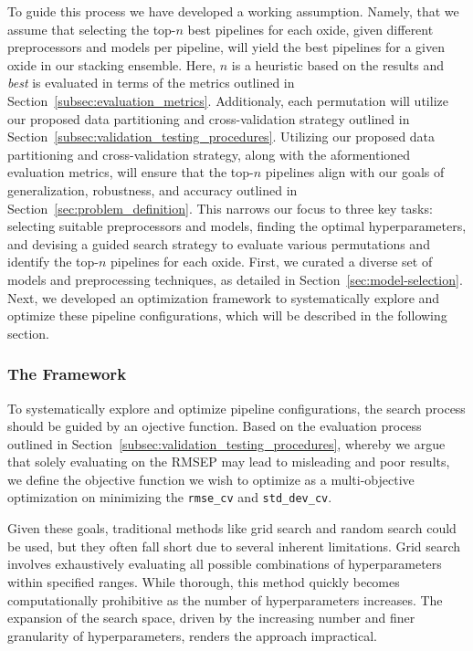 To guide this process we have developed a working assumption.
Namely, that we assume that selecting the top-$n$ best pipelines for each oxide, given different preprocessors and models per pipeline, will yield the best pipelines for a given oxide in our stacking ensemble.
Here, $n$ is a heuristic based on the results and \textit{best} is evaluated in terms of the metrics outlined in Section~\ref{subsec:evaluation_metrics}.
Additionaly, each permutation will utilize our proposed data partitioning and cross-validation strategy outlined in Section~\ref{subsec:validation_testing_procedures}.
Utilizing our proposed data partitioning and cross-validation strategy, along with the aformentioned evaluation metrics, will ensure that the top-$n$ pipelines align with our goals of generalization, robustness, and accuracy outlined in Section~\ref{sec:problem_definition}.
This narrows our focus to three key tasks: selecting suitable preprocessors and models, finding the optimal hyperparameters, and devising a guided search strategy to evaluate various permutations and identify the top-$n$ pipelines for each oxide.
First, we curated a diverse set of models and preprocessing techniques, as detailed in Section~\ref{sec:model-selection}.
Next, we developed an optimization framework to systematically explore and optimize these pipeline configurations, which will be described in the following section.

\subsubsection{The Framework}
To systematically explore and optimize pipeline configurations, the search process should be guided by an ojective function.
Based on the evaluation process outlined in Section~\ref{subsec:validation_testing_procedures}, whereby we argue that solely evaluating on the RMSEP may lead to misleading and poor results, we define the objective function we wish to optimize as a multi-objective optimization on minimizing the \texttt{rmse\_cv} and \texttt{std\_dev\_cv}. 

Given these goals, traditional methods like grid search and random search could be used, but they often fall short due to several inherent limitations. 
Grid search involves exhaustively evaluating all possible combinations of hyperparameters within specified ranges. 
While thorough, this method quickly becomes computationally prohibitive as the number of hyperparameters increases. The expansion of the search space, driven by the increasing number and finer granularity of hyperparameters, renders the approach impractical.

